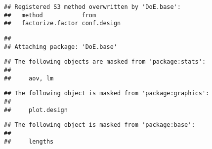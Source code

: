 \documentclass[
]{article}
\begin{document}
\begin{verbatim}
## Registered S3 method overwritten by 'DoE.base':
##   method           from       
##   factorize.factor conf.design
\end{verbatim}

\begin{verbatim}
## 
## Attaching package: 'DoE.base'
\end{verbatim}

\begin{verbatim}
## The following objects are masked from 'package:stats':
## 
##     aov, lm
\end{verbatim}

\begin{verbatim}
## The following object is masked from 'package:graphics':
## 
##     plot.design
\end{verbatim}

\begin{verbatim}
## The following object is masked from 'package:base':
## 
##     lengths
\end{verbatim}
\end{document}
